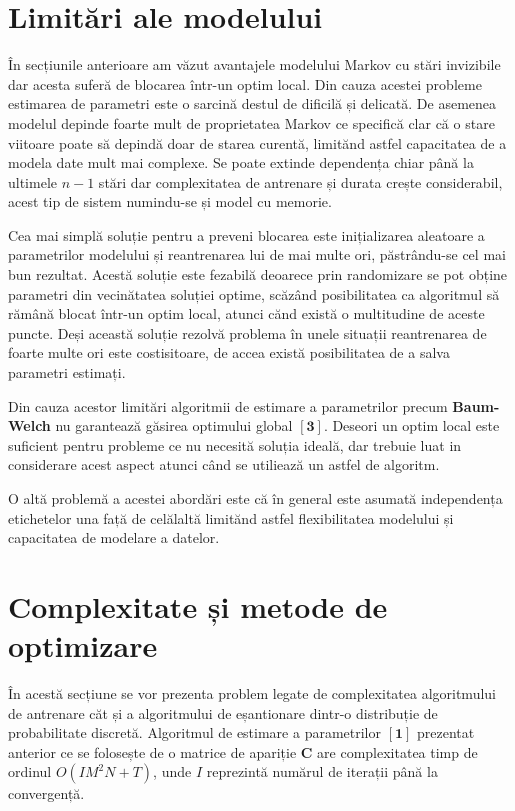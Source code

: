 \section{Limitări ale modelului}

În secțiunile anterioare am văzut avantajele modelului Markov cu stări invizibile dar acesta suferă de blocarea într-un optim local. Din cauza acestei probleme estimarea de parametri este o sarcină destul de dificilă și delicată. De asemenea modelul depinde foarte mult de proprietatea Markov ce specifică clar că o stare viitoare poate să depindă doar de starea curentă, limitănd astfel capacitatea de a modela date mult mai complexe. Se poate extinde dependența chiar până la ultimele $n-1$ stări dar complexitatea de antrenare și durata crește considerabil, acest tip de sistem numindu-se și model cu memorie.
\par

Cea mai simplă soluție pentru a preveni blocarea este inițializarea aleatoare a parametrilor modelului și reantrenarea lui de mai multe ori, păstrându-se cel mai bun rezultat. Acestă soluție este fezabilă deoarece prin randomizare se pot obține parametri din vecinătatea soluției optime, scăzând posibilitatea ca algoritmul să rămână blocat într-un optim local, atunci cănd există o multitudine de aceste puncte. Deși această soluție rezolvă problema în unele situații reantrenarea de foarte multe ori este costisitoare, de accea există posibilitatea de a salva parametri estimați.\par

Din cauza acestor limitări algoritmii de estimare a parametrilor precum \textbf{Baum-Welch} nu garantează găsirea optimului global ${\mathbf{[3]}}$. Deseori un optim local este suficient pentru probleme ce nu necesită soluția ideală, dar trebuie luat in considerare acest aspect atunci când se utiliează un astfel de algoritm.\par

O altă problemă a acestei abordări este că în general este asumată independența etichetelor una față de celălaltă limitănd astfel flexibilitatea modelului și capacitatea de modelare a datelor.\par

\section{Complexitate și metode de optimizare}

În acestă secțiune se vor prezenta problem legate de complexitatea algoritmului de antrenare căt și a algoritmului de eșantionare dintr-o distribuție de probabilitate discretă. Algoritmul de estimare a parametrilor ${\mathbf{[1]}}$ prezentat anterior ce se folosește de o matrice de apariție \textbf{C} are complexitatea timp de ordinul $O(IM^{2}N+T)$, unde $I$ reprezintă numărul de iterații până la convergență.\par

